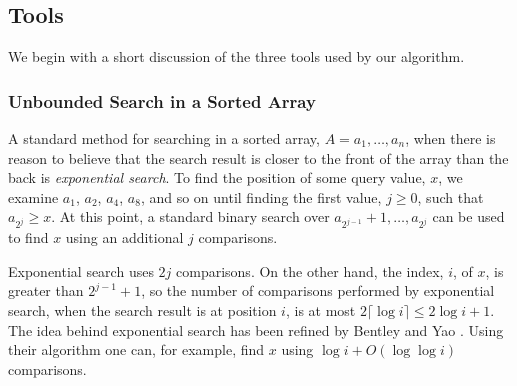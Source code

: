 \documentclass{patmorin}
\DeclareMathOperator{\logsum}{logsum}
\begin{document}
\subsection{Tools}

We begin with a short discussion of the three tools used by our algorithm.

\subsubsection{Unbounded Search in a Sorted Array}

A standard method for searching in a sorted array, $A=a_1,\ldots,a_n$,
when there is reason to believe that the search result is closer to
the front of the array than the back is \emph{exponential search}.
To find the position of some query value, $x$, we examine $a_1$,
$a_2$, $a_4$, $a_8$, and so on until finding the first value, $j\ge 0$,
such that $a_{2^j} \ge x$.  At this point, a standard binary search
over $a_{2^{j-1}}+1,\ldots,a_{2^j}$ can be used to find $x$ using an
additional $j$ comparisons.

Exponential search uses $2j$ comparisons. On the other hand, the index,
$i$, of $x$, is greater than $2^{j-1}+1$, so the number of comparisons
performed by exponential search, when the search result is at position
$i$, is at most $2\lceil\log i\rceil\le 2\log i + 1$.  The idea behind
exponential search has been refined by Bentley and Yao \cite{byXX}.
Using their algorithm one can, for example, find $x$ using $\log i+
O(\log\log i)$ comparisons.

%
%
%
%
\end{document}
